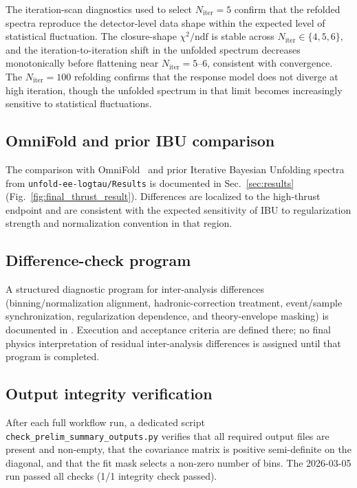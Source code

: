 The iteration-scan diagnostics used to select $N_{\mathrm{iter}}=5$ confirm that the refolded spectra reproduce the detector-level data shape within the expected level of statistical fluctuation. The closure-shape $\chi^2/\mathrm{ndf}$ is stable across $N_\mathrm{iter}\in\{4,5,6\}$, and the iteration-to-iteration shift in the unfolded spectrum decreases monotonically before flattening near $N_\mathrm{iter}=5$--$6$, consistent with convergence. The $N_\mathrm{iter}=100$ refolding confirms that the response model does not diverge at high iteration, though the unfolded spectrum in that limit becomes increasingly sensitive to statistical fluctuations.

\subsection{OmniFold and prior IBU comparison}

The comparison with OmniFold~\cite{Andreassen:2019cjw} and prior Iterative Bayesian Unfolding spectra from \texttt{unfold-ee-logtau/Results} is documented in Sec.~\ref{sec:results} (Fig.~\ref{fig:final_thrust_result}). Differences are localized to the high-thrust endpoint and are consistent with the expected sensitivity of IBU to regularization strength and normalization convention in that region.

\subsection{Difference-check program}

A structured diagnostic program for inter-analysis differences (binning/normalization alignment, hadronic-correction treatment, event/sample synchronization, regularization dependence, and theory-envelope masking) is documented in . Execution and acceptance criteria are defined there; no final physics interpretation of residual inter-analysis differences is assigned until that program is completed.

\subsection{Output integrity verification}

After each full workflow run, a dedicated script \texttt{check\_prelim\_summary\_outputs.py} verifies that all required output files are present and non-empty, that the covariance matrix is positive semi-definite on the diagonal, and that the fit mask selects a non-zero number of bins. The 2026-03-05 run passed all checks (1/1 integrity check passed).

